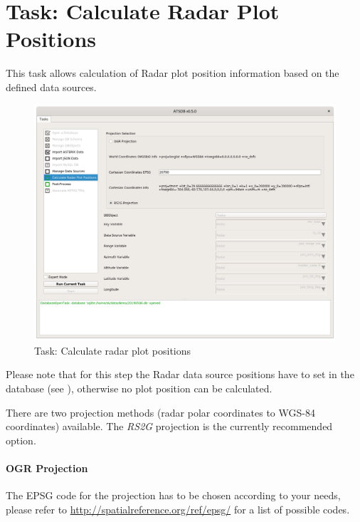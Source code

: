 \section{Task: Calculate Radar Plot Positions}
\label{sec:task_calc_radar_pos}

This task allows calculation of Radar plot position information based on the defined data sources.

\begin{figure}[H]
  \hspace*{-2.5cm}
    \includegraphics[width=19cm]{../screenshots/task_calc_radar.png}
  \caption{Task: Calculate radar plot positions}
  \label{fig:task_calc_radar}
\end{figure}


Please note that for this step the Radar data source positions have to set in the database (see ), otherwise no plot position can be calculated. 

There are two projection methods (radar polar coordinates to WGS-84 coordinates) available. The \textit{RS2G} projection is the currently recommended option.

\paragraph{OGR Projection}

The EPSG code for the projection has to be chosen according to your needs, please refer to \url{http://spatialreference.org/ref/epsg/} for a list of possible codes.

